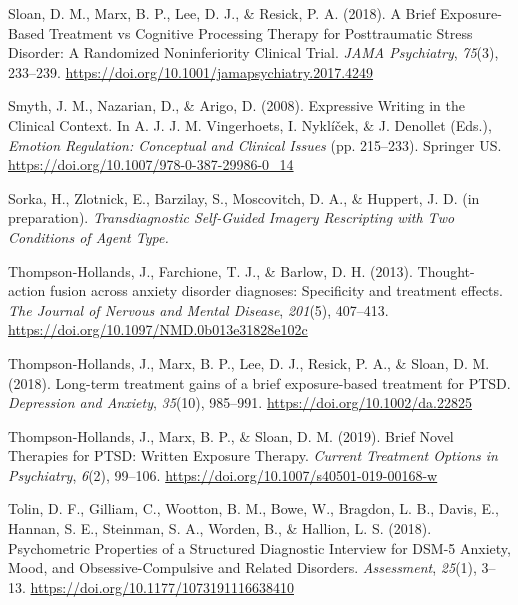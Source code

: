 \documentclass[
  man,floatsintext]{apa7}
\newlength{\cslhangindent}
\newlength{\cslentryspacingunit} %
\newenvironment{CSLReferences}[2] %
 {%
  \setlength{\parindent}{0pt}
  \ifodd #1
  \let\oldpar\par
  \def\par{\hangindent=\cslhangindent\oldpar}
  \fi
  \setlength{\parskip}{#2\cslentryspacingunit}
 }%
 {}
\begin{document}
\begin{CSLReferences}{1}{0}
\leavevmode{}%
Sloan, D. M., Marx, B. P., Lee, D. J., \& Resick, P. A. (2018). A Brief Exposure-Based Treatment vs Cognitive Processing Therapy for Posttraumatic Stress Disorder: A Randomized Noninferiority Clinical Trial. \emph{JAMA Psychiatry}, \emph{75}(3), 233--239. \url{https://doi.org/10.1001/jamapsychiatry.2017.4249}

\leavevmode{}%
Smyth, J. M., Nazarian, D., \& Arigo, D. (2008). Expressive Writing in the Clinical Context. In A. J. J. M. Vingerhoets, I. Nyklíček, \& J. Denollet (Eds.), \emph{Emotion Regulation: Conceptual and Clinical Issues} (pp. 215--233). Springer US. \url{https://doi.org/10.1007/978-0-387-29986-0_14}

\leavevmode{}%
Sorka, H., Zlotnick, E., Barzilay, S., Moscovitch, D. A., \& Huppert, J. D. (in preparation). \emph{Transdiagnostic Self-Guided Imagery Rescripting with Two Conditions of Agent Type.}

\leavevmode{}%
Thompson-Hollands, J., Farchione, T. J., \& Barlow, D. H. (2013). Thought-action fusion across anxiety disorder diagnoses: Specificity and treatment effects. \emph{The Journal of Nervous and Mental Disease}, \emph{201}(5), 407--413. \url{https://doi.org/10.1097/NMD.0b013e31828e102c}

\leavevmode{}%
Thompson-Hollands, J., Marx, B. P., Lee, D. J., Resick, P. A., \& Sloan, D. M. (2018). Long-term treatment gains of a brief exposure-based treatment for PTSD. \emph{Depression and Anxiety}, \emph{35}(10), 985--991. \url{https://doi.org/10.1002/da.22825}

\leavevmode{}%
Thompson-Hollands, J., Marx, B. P., \& Sloan, D. M. (2019). Brief Novel Therapies for PTSD: Written Exposure Therapy. \emph{Current Treatment Options in Psychiatry}, \emph{6}(2), 99--106. \url{https://doi.org/10.1007/s40501-019-00168-w}

\leavevmode{}%
Tolin, D. F., Gilliam, C., Wootton, B. M., Bowe, W., Bragdon, L. B., Davis, E., Hannan, S. E., Steinman, S. A., Worden, B., \& Hallion, L. S. (2018). Psychometric Properties of a Structured Diagnostic Interview for DSM-5 Anxiety, Mood, and Obsessive-Compulsive and Related Disorders. \emph{Assessment}, \emph{25}(1), 3--13. \url{https://doi.org/10.1177/1073191116638410}


\end{CSLReferences}
\end{document}
